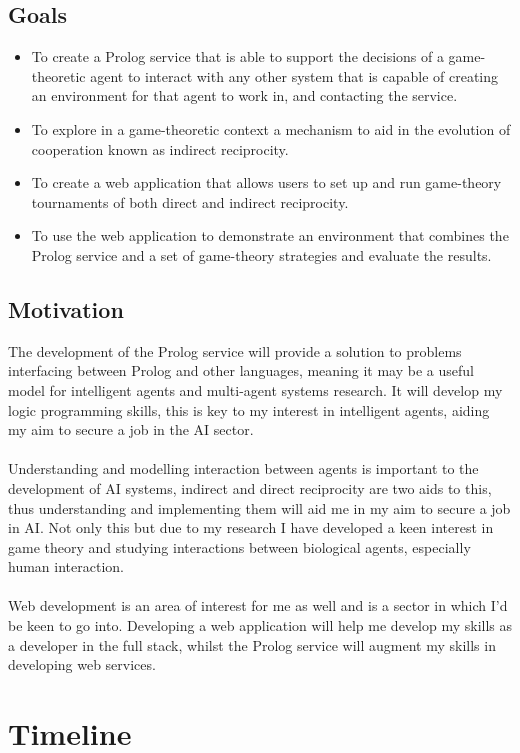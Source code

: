 \documentclass{article}
\begin{document}
\subsection*{Goals}
\begin{itemize}
\item To create a Prolog service that is able to support the decisions of a game-theoretic agent to interact with any other system that is capable of creating an environment for that agent to work in, and contacting the service.
\item To explore in a game-theoretic context a mechanism to aid in the evolution of cooperation known as indirect reciprocity.
\item To create a web application that allows users to set up and run game-theory tournaments of both direct and indirect reciprocity.
\item To use the web application to demonstrate an environment that combines the Prolog service and a set of game-theory strategies and evaluate the results.
\end{itemize}

\subsection*{Motivation}
The development of the Prolog service will provide a solution to problems interfacing between Prolog and other languages, meaning it may be a useful model for intelligent agents and multi-agent systems research. It will develop my logic programming skills, this is key to my interest in intelligent agents, aiding my aim to secure a job in the AI sector.\\\\
Understanding and modelling interaction between agents is important to the development of AI systems, indirect and direct reciprocity are two aids to this, thus understanding and implementing them will aid me in my aim to secure a job in AI. Not only this but due to my research I have developed a keen interest in game theory and studying interactions between biological agents, especially human interaction.\\\\
Web development is an area of interest for me as well and is a sector in which I'd be keen to go into. Developing a web application will help me develop my skills as a developer in the full stack, whilst the Prolog service will augment my skills in developing web services.

\section*{Timeline}
\end{document}
